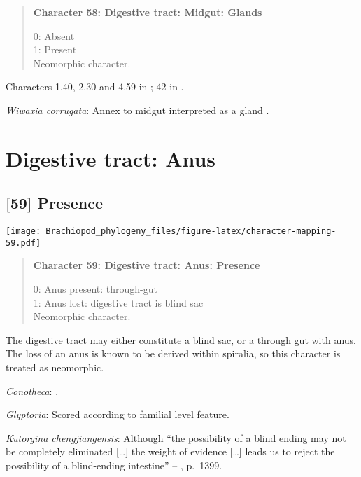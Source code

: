 \documentclass[openany]{book}
\theoremstyle{definition}
\theoremstyle{definition}
\theoremstyle{definition}
\theoremstyle{remark}
\begin{document}
\begin{quote}
\textbf{Character 58: Digestive tract: Midgut: Glands}

0: Absent\\
1: Present\\
Neomorphic character.
\end{quote}

Characters 1.40, 2.30 and 4.59 in \citet{SPS1996}; 42 in
\citet{Haszprunar2000}.

\hypertarget{Wiwaxia_corrugata-coding-58}{}
\emph{Wiwaxia corrugata}: Annex to midgut interpreted as a gland
\citep{Smith2012M}.

\section{Digestive tract: Anus}\label{digestive-tract-anus}

\subsection*{{[}59{]} Presence}\label{presence-3}

\texttt{[image: Brachiopod\_phylogeny\_files/figure-latex/character-mapping-59.pdf]}

\begin{quote}
\textbf{Character 59: Digestive tract: Anus: Presence}

0: Anus present: through-gut\\
1: Anus lost: digestive tract is blind sac\\
Neomorphic character.
\end{quote}

The digestive tract may either constitute a blind sac, or a through gut
with anus. The loss of an anus is known to be derived within spiralia,
so this character is treated as neomorphic.

\hypertarget{Conotheca-coding-59}{}
\emph{Conotheca}: \citep{Devaere2014}.

\hypertarget{Glyptoria-coding-59}{}
\emph{Glyptoria}: Scored according to familial level feature.

\hypertarget{Kutorgina_chengjiangensis-coding-59}{}
\emph{Kutorgina chengjiangensis}: Although ``the possibility of a blind
ending may not be completely eliminated {[}\ldots{}{]} the weight of
evidence {[}\ldots{}{]} leads us to reject the possibility of a
blind-ending intestine'' --
\citet{Zhang2007Rhynchonelliformeanbrachiopods}, p.~1399.
\end{document}
